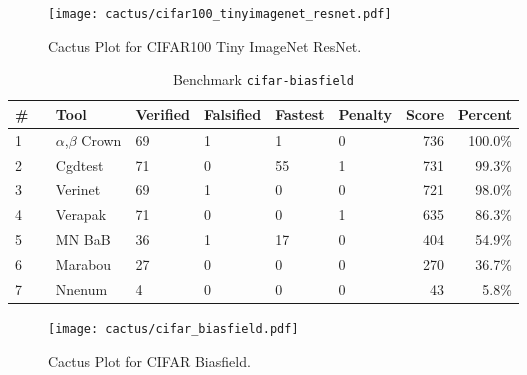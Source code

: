 \begin{figure}[h]
\centerline{\texttt{[image: cactus/cifar100\_tinyimagenet\_resnet.pdf]}}
\caption{Cactus Plot for CIFAR100 Tiny ImageNet ResNet.}
\label{fig:quantPic}
\end{figure}



\begin{table}[h]
\begin{center}
\caption{Benchmark \texttt{cifar-biasfield}} \label{tab:cat_{cat}}
{\setlength{\tabcolsep}{2pt}
\begin{tabular}[h]{@{}llllllrr@{}}
\toprule
\textbf{\# ~} & \textbf{Tool} & \textbf{Verified} & \textbf{Falsified} & \textbf{Fastest} & \textbf{Penalty} & \textbf{Score} & \textbf{Percent}\\
\midrule
1 & $\alpha$,$\beta$ Crown & 69 & 1 & 1 & 0 & 736 & 100.0\% \\
2 & Cgdtest & 71 & 0 & 55 & 1 & 731 & 99.3\% \\
3 & Verinet & 69 & 1 & 0 & 0 & 721 & 98.0\% \\
4 & Verapak & 71 & 0 & 0 & 1 & 635 & 86.3\% \\
5 & MN BaB & 36 & 1 & 17 & 0 & 404 & 54.9\% \\
6 & Marabou & 27 & 0 & 0 & 0 & 270 & 36.7\% \\
7 & Nnenum & 4 & 0 & 0 & 0 & 43 & 5.8\% \\
\bottomrule
\end{tabular}
}
\end{center}
\end{table}



\begin{figure}[h]
\centerline{\texttt{[image: cactus/cifar\_biasfield.pdf]}}
\caption{Cactus Plot for CIFAR Biasfield.}
\label{fig:quantPic}
\end{figure}



